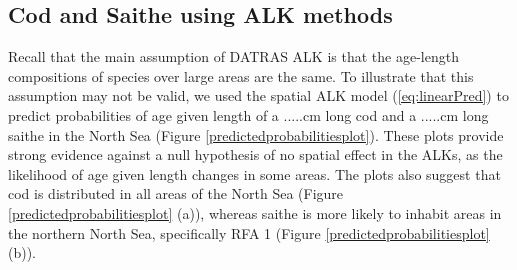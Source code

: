 \documentclass[a4paper 12pt]{article}
\numberwithin{equation}{section}
\begin{document}
\subsection{Cod and Saithe using ALK methods}
\label{sec:codresults}

Recall that the main assumption of DATRAS ALK is that the age-length compositions of species over large areas are the same. To illustrate that this assumption may not be valid, we used  the spatial ALK model (\ref{eq:linearPred}) to predict probabilities of age given length of a .....cm long cod and a .....cm long saithe in the North Sea (Figure \ref{predictedprobabilitiesplot}). These plots provide strong evidence against a null hypothesis of no spatial effect in the ALKs, as the likelihood of age given length changes in some areas. The plots also suggest that cod is distributed in all areas of the North Sea (Figure \ref{predictedprobabilitiesplot} (a)), whereas saithe is more likely to inhabit areas in the northern North Sea, specifically RFA 1 (Figure \ref{predictedprobabilitiesplot} (b)).
\end{document}

